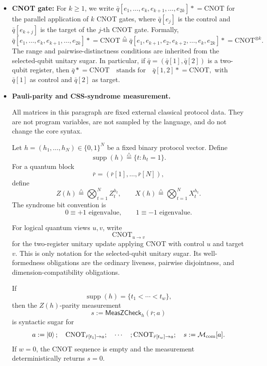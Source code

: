 \documentclass[acmsmall,screen,review,anonymous,nonacm]{acmart}
\theoremstyle{defn_style}
\newcommand{\asteq}{\mathrel{*}=}
\begin{document}
\begin{itemize}
    \item \textbf{CNOT gate:}
    For \(k\ge 1\), we write
    \(\bar q[e_1,\ldots,e_k,e_{k+1},\ldots,e_{2k}]\asteq \mathrm{CNOT}\)
    for the parallel application of \(k\) CNOT gates, where \(\bar q[e_j]\)
    is the control and \(\bar q[e_{k+j}]\) is the target of the \(j\)-th CNOT
    gate. Formally,
    \[
    \bar q[e_1,\ldots,e_k,e_{k+1},\ldots,e_{2k}]\asteq \mathrm{CNOT}
    \stackrel{\triangle}{=}
    \bar q[e_1,e_{k+1},e_2,e_{k+2},\ldots,e_k,e_{2k}]
    \asteq \mathrm{CNOT}^{\otimes k}.
    \]
    The range and pairwise-distinctness conditions are inherited from the
    selected-qubit unitary sugar. In particular, if
    \(\bar q=(\bar q[1],\bar q[2])\) is a two-qubit register, then
    \(\bar q\asteq \mathrm{CNOT}
    \quad\text{stands for}\quad
    \bar q[1,2]\asteq \mathrm{CNOT},\)
    with \(\bar q[1]\) as control and \(\bar q[2]\) as target.

    \item \textbf{Pauli-parity and CSS-syndrome measurement.}
    
    All matrices in this paragraph are fixed external classical protocol data.
    They are not program variables, are not sampled by the language, and do not
    change the core syntax.
    
    Let \(h=(h_1,\ldots,h_N)\in\{0,1\}^{N}\) be a fixed binary protocol vector.
    Define
    \[
    \operatorname{supp}(h)
    \stackrel{\triangle}{=}
    \{t: h_t=1\}.
    \]
    For a quantum block
    \[
    \bar r=(\bar r[1],\ldots,\bar r[N]),
    \]
    define
    \[
    Z(h)\stackrel{\triangle}{=}\bigotimes_{t=1}^{N}Z_t^{h_t},
    \qquad
    X(h)\stackrel{\triangle}{=}\bigotimes_{t=1}^{N}X_t^{h_t}.
    \]
    The syndrome bit convention is
    \[
    0\equiv +1\text{ eigenvalue},
    \qquad
    1\equiv -1\text{ eigenvalue}.
    \]
    
    For logical quantum views \(u,v\), write
    \[
    \operatorname{CNOT}_{u\rightarrow v}
    \]
    for the two-register unitary update applying CNOT with control \(u\) and
    target \(v\). This is only notation for the selected-qubit unitary sugar.
    Its well-formedness obligations are the ordinary liveness, pairwise
    disjointness, and dimension-compatibility obligations.
    
    If
    \[
    \operatorname{supp}(h)=\{t_1<\cdots<t_w\},
    \]
    then the \(Z(h)\)-parity measurement
    \[
    s:=\mathsf{MeasZCheck}_{h}(\bar r;a)
    \]
    is syntactic sugar for
    \[
    a:=\ket0;
    \quad
    \operatorname{CNOT}_{\bar r[t_1]\rightarrow a};
    \quad\cdots\quad;
    \operatorname{CNOT}_{\bar r[t_w]\rightarrow a};
    \quad
    s:=\mathcal M_{\mathrm{com}}[a].
    \]
    If \(w=0\), the CNOT sequence is empty and the measurement deterministically
    returns \(s=0\).
    

\end{itemize}
\end{document}
